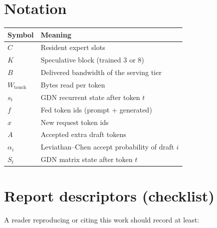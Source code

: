 \section{Notation}
\label{app:notation}

\begin{center}
\begin{tabular}{@{}ll@{}}
\toprule
Symbol & Meaning \\
\midrule
$C$ & Resident expert slots \\
$K$ & Speculative block (trained 3 or 8) \\
$B$ & Delivered bandwidth of the serving tier \\
$W_{\mathrm{touch}}$ & Bytes read per token \\
$s_t$ & GDN recurrent state after token $t$ \\
$f$ & Fed token ids (prompt + generated) \\
$x$ & New request token ids \\
$A$ & Accepted extra draft tokens \\
$\alpha_i$ & Leviathan--Chen accept probability of draft $i$ \\
$S_t$ & GDN matrix state after token $t$ \\
\bottomrule
\end{tabular}
\end{center}

\section{Report descriptors (checklist)}
\label{app:desc}

A reader reproducing or citing this work should record at least:

